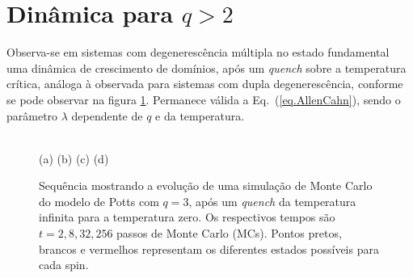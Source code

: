 \section{Dinâmica para $q>2$}

Observa-se em sistemas com degenerescência múltipla no estado fundamental uma dinâmica de crescimento de domínios, após um \textit{quench} sobre a temperatura crítica, análoga à observada para sistemas com dupla degenerescência, conforme se pode observar na figura \ref{fig.PottsSnap}. Permanece válida a Eq.~(\ref{eq.AllenCahn}), sendo o parâmetro $\lambda$ dependente de $q$ e da temperatura.

\begin{figure}[h!]
 \setlength\fboxsep{0pt}
 \setlength\fboxrule{0.5pt}
 \centering
  \\
 (a) \hspace{30mm} (b) \hspace{30mm} (c) \hspace{30mm} (d) \vspace{3mm} \\
 \caption{Sequência mostrando a evolução de uma simulação de Monte Carlo do modelo de Potts com $q=3$, após um \textit{quench} da temperatura infinita para a temperatura zero. Os respectivos tempos são $t=2,8,32,256$ passos de Monte Carlo (MCs). Pontos pretos, brancos e vermelhos representam os diferentes estados possíveis para cada spin.}
 \label{fig.PottsSnap}
\end{figure}

